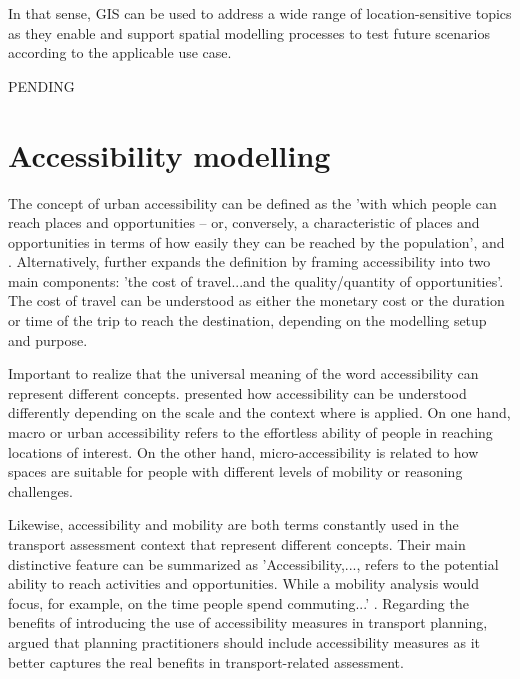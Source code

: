 \documentclass[12pt, a4paper]{report}
\begin{document}
In that sense, GIS can be used to address a wide range of location-sensitive topics as they enable and support spatial modelling processes to test future scenarios according to the applicable use case.

PENDING






\section{Accessibility modelling}

The concept of urban accessibility can be defined as the 'with which people can reach places and opportunities – or, conversely, a characteristic of places and opportunities in terms of how easily they can be reached by the population', \cite{geursAccessibilityEvaluationLanduse2004b} and \cite{neutensEquityUrbanService2010}. Alternatively, \cite{paezMeasuringAccessibilityPositive2012} further expands the definition by framing accessibility into two main components: 'the cost of travel...and the quality/quantity of opportunities'. The cost of travel can be understood as either the monetary cost or the duration or time of the trip to reach the destination, depending on the modelling setup and purpose.

Important to realize that the universal meaning of the word accessibility can represent different concepts. \cite{pereiraIntroductionUrbanAccessibility2023a} presented how accessibility can be understood differently depending on the scale and the context where is applied. On one hand, macro or urban accessibility refers to the effortless ability of people in reaching locations of interest. On the other hand, micro-accessibility is related to how spaces are suitable for people with different levels of mobility or reasoning challenges. 



Likewise, accessibility and mobility are both terms constantly used in the transport assessment context that represent different concepts. Their main distinctive feature can be summarized 
as 'Accessibility,..., refers to the potential ability to reach activities and opportunities. While a mobility analysis would focus, for example, on the time people spend commuting...' \cite{pereiraIntroductionUrbanAccessibility2023a}. Regarding the benefits of introducing the use of accessibility measures in transport planning, \cite{ferreiraAccessibilityGoldMobility2012} argued that planning practitioners should include accessibility measures as it better captures the real benefits in transport-related assessment.
\end{document}
